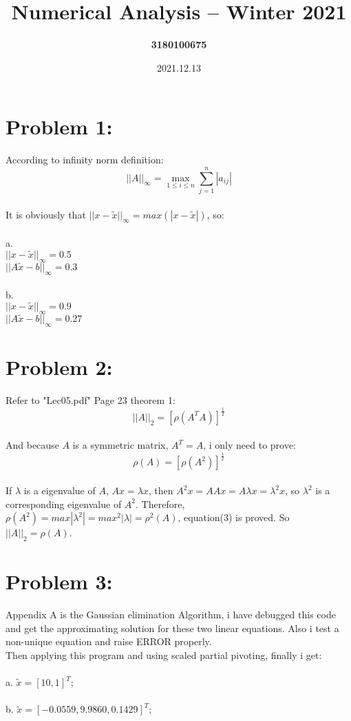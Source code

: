 \documentclass{article}
\title{\textbf{Numerical Analysis – Winter 2021}}
\author{\textbf{3180100675}}
\date{2021.12.13}
\begin{document}
\maketitle

\section{Problem 1:}  
According to infinity norm definition: \\
\begin{equation}
    ||A||_{\infty} = \max_{1\leq i\leq n} \sum_{j=1}^n |a_{ij}|
\end{equation}
\\
It is obviously that $||x-\widetilde{x}||_{\infty} = max(|x-\widetilde{x}|)$, so: \\
\\
a. \\
$||x-\widetilde{x}||_{\infty} = 0.5$ \\
$||A\widetilde{x}-b||_{\infty} = 0.3$ \\
\\
b. \\
$||x-\widetilde{x}||_{\infty} = 0.9$ \\
$||A\widetilde{x}-b||_{\infty} = 0.27$ \\

\newpage
\section{Problem 2:}
Refer to "Lec05.pdf" Page 23 theorem 1: \\
\begin{equation}
    ||A||_{2} = [\rho(A^{T}A)]^{\frac{1}{2}}
\end{equation}
\\
And because $A$ is a symmetric matrix, $A^{T} = A$, i only need to prove:
\begin{equation}
    \rho(A) = [\rho(A^{2})]^{\frac{1}{2}}
\end{equation}
\\
If $\lambda$ is a eigenvalue of $A$, $Ax=\lambda x$, then $A^2x=AAx=A\lambda x=\lambda^2x$, so $\lambda^2$ is a corresponding eigenvalue of $A^2$. Therefore, $\rho(A^2)=max|\lambda^2|=max^2|\lambda|=\rho^2(A)$, equation(3) is proved. So $||A||_2=\rho(A)$.

\section{Problem 3:}
Appendix A is the Gaussian elimination Algorithm, i have debugged this code and get the approximating solution for these two linear equations. Also i test a non-unique equation and raise ERROR properly.\\
Then applying this program and using scaled partial pivoting, finally i get: \\
\\
a. $\widetilde{x}=[10, 1]^T$; \\
\\
b. $\widetilde{x}=[-0.0559, 9.9860, 0.1429]^T$;
\end{document}
